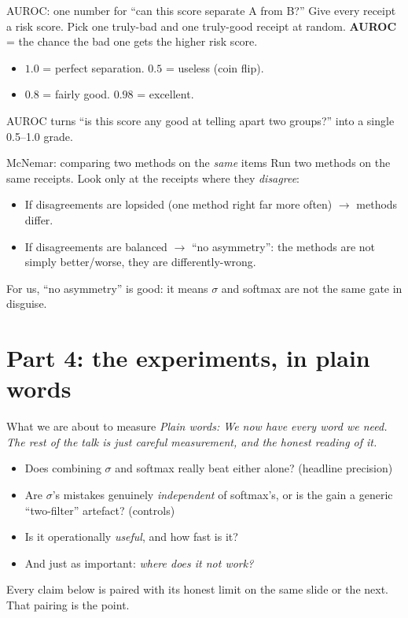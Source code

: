 \documentclass[aspectratio=169]{beamer}
\newcommand{\keybox}[1]{\begin{center}\colorbox{grey!15}{\parbox{0.92\linewidth}{\centering #1}}\end{center}}
\newcommand{\plain}[1]{\textit{\textcolor{sig}{Plain words:} #1}}
\begin{document}
\begin{frame}{AUROC: one number for ``can this score separate A from B?''}
Give every receipt a risk score. Pick one truly-bad and one truly-good
receipt at random. \textbf{AUROC} = the chance the bad one gets the
higher risk score.
\begin{itemize}
\item $1.0$ = perfect separation. \quad $0.5$ = useless (coin flip).
\item $0.8$ = fairly good. $0.98$ = excellent.
\end{itemize}
\keybox{AUROC turns ``is this score any good at telling apart two
groups?'' into a single 0.5--1.0 grade.}
\end{frame}

\begin{frame}{McNemar: comparing two methods on the \emph{same} items}
Run two methods on the same receipts. Look only at the receipts where
they \emph{disagree}:
\begin{itemize}
\item If disagreements are lopsided (one method right far more often)
$\to$ methods differ.
\item If disagreements are balanced $\to$ ``no asymmetry'': the
methods are not simply better/worse, they are differently-wrong.
\end{itemize}
\keybox{For us, ``no asymmetry'' is good: it means $\sigma$ and
softmax are not the same gate in disguise.}
\end{frame}

\section{Part 4: the experiments, in plain words}
\begin{frame}{What we are about to measure}
\plain{We now have every word we need. The rest of the talk is just
careful measurement, and the honest reading of it.}
\begin{itemize}
\item Does combining $\sigma$ and softmax really beat either alone?
(headline precision)
\item Are $\sigma$'s mistakes genuinely \emph{independent} of softmax's,
or is the gain a generic ``two-filter'' artefact? (controls)
\item Is it operationally \emph{useful}, and how fast is it?
\item And just as important: \emph{where does it not work?}
\end{itemize}
\keybox{Every claim below is paired with its honest limit on the same
slide or the next. That pairing is the point.}
\end{frame}
\end{document}
